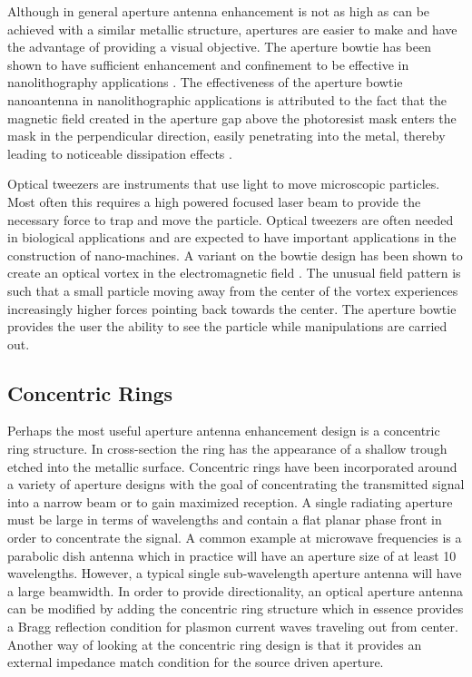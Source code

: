\documentclass[11pt]{article}
\begin{document}
Although in general aperture antenna enhancement is not as high as can be achieved with a similar metallic structure, apertures are easier to make and have the advantage of providing a visual objective. The aperture bowtie has been shown to have sufficient enhancement and confinement to be effective in nanolithography applications \cite{Wang2006}. The effectiveness of the aperture bowtie nanoantenna in nanolithographic applications is attributed to the fact that the magnetic field created in the aperture gap above the photoresist mask enters the mask in the perpendicular direction, easily penetrating into the metal, thereby leading to noticeable dissipation effects \cite{Grosjean2011}.

Optical tweezers are instruments that use light to move microscopic particles. Most often this requires a high powered focused laser beam to provide the necessary force to trap and move the particle. Optical tweezers are often needed in biological applications and are expected to have important applications in the construction of nano-machines. A variant on the bowtie design has been shown to create an optical vortex in the electromagnetic field \cite{Kang2011}. The unusual field pattern is such that a small particle moving away from the center of the vortex experiences increasingly higher forces pointing back towards the center. The aperture bowtie provides the user the ability to see the particle while manipulations are carried out.
\subsection{Concentric Rings}
%
Perhaps the most useful aperture antenna enhancement design is a concentric ring structure. In cross-section the ring has the appearance of a shallow trough etched into the metallic surface. Concentric rings have been incorporated around a variety of aperture designs with the goal of concentrating the transmitted signal into a narrow beam or to gain maximized reception. A single radiating aperture must be large in terms of wavelengths and contain a flat planar phase front in order to concentrate the signal. A common example at microwave frequencies is a parabolic dish antenna which in practice will have an aperture size of at least 10 wavelengths. However, a typical single sub-wavelength aperture antenna will have a large beamwidth. In order to provide directionality, an optical aperture antenna can be modified by adding the concentric ring structure which in essence provides a Bragg reflection condition for plasmon current waves traveling out from center. Another way of looking at the concentric ring design is that it provides an external impedance match condition for the source driven aperture.
\end{document}
